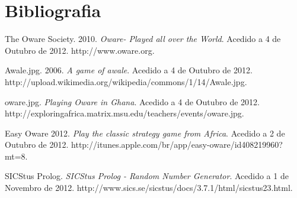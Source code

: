 \documentclass[15pt,a4paper]{article}
\begin{document}
\newpage
\section{Bibliografia}
\begin{thebibliography}{9}

  The Oware Society.
  2010.
  \emph{ Oware- Played all over the World}.
  Acedido a 4 de Outubro de 2012.
  http://www.oware.org.
  
  Awale.jpg.
  2006.
  \emph{A game of awale}.
  Acedido a 4 de Outubro de 2012.
  http://upload.wikimedia.org/wikipedia/commons/1/14/Awale.jpg.
  
	oware.jpg.
  \emph{Playing Oware in Ghana}.
  Acedido a 4 de Outubro de 2012.
  http://exploringafrica.matrix.msu.edu/teachers/events/oware.jpg.
  
	Easy Oware
	2012.
  \emph{Play the classic strategy game from Africa}.
  Acedido a 2 de Outubro de 2012.
  http://itunes.apple.com/br/app/easy-oware/id408219960?mt=8.
  
  SICStus Prolog.
  \emph{SICStus Prolog - Random Number Generator}.
    Acedido a 1 de Novembro de 2012.
  http://www.sics.se/sicstus/docs/3.7.1/html/sicstus\textunderscore23.html.

\end{thebibliography}

\newpage
\appendix
\end{document}
